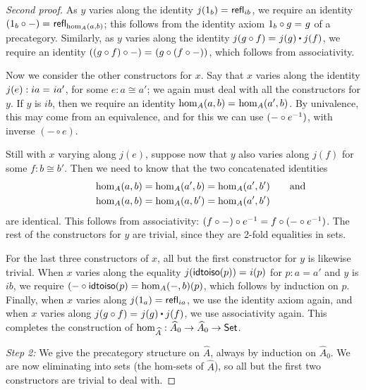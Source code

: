 \begin{proof}[Second proof]
  As $y$ varies along the identity $j(1_b) =_{} \mathsf{refl}_{ib}$, we require an identity $(1_b\circ -) =_{} \mathsf{refl}_{\hom_A(a,b)}$; this follows from the identity axiom $1_b\circ g =_{} g$ of a precategory.
  Similarly, as $y$ varies along the identity $\id{j(g\circ f)}{j(g)\ct j(f)}$, we require an identity $((g\circ f)\circ -) =_{} (g\circ (f\circ -))$, which follows from associativity.

  Now we consider the other constructors for $x$.
  Say that $x$ varies along the identity $j(e):ia =_{} ia'$, for some $e:a \cong a'$; we again must deal with all the constructors for $y$.
  If $y$ is $ib$, then we require an identity $\hom_A(a,b) =_{} \hom_A(a',b)$.
  By univalence, this may come from an equivalence, and for this we can use $(-\circ {e}^{-1})$, with inverse $(-\circ e)$.

  Still with $x$ varying along $j(e)$, suppose now that $y$ also varies along $j(f)$ for some $f:b\cong b'$.
  Then we need to know that the two concatenated identities
  \begin{gather*}
    \hom_A(a,b) = \hom_A(a',b) = \hom_A(a',b') \mathrlap{\qquad\text{and}}\\
    \hom_A(a,b) = \hom_A(a,b') = \hom_A(a',b')
  \end{gather*}
  are identical.
  This follows from associativity: $(f\circ -)\circ {e}^{-1} = f\circ (-\circ {e}^{-1})$.
  The rest of the constructors for $y$ are trivial, since they are 2-fold equalities in sets.

  For the last three constructors of $x$, all but the first constructor for $y$ is likewise trivial.
  When $x$ varies along the equality $j(\mathsf{idtoiso}(p)) =_{} {i}\mathopen{}\left({p}\right)\mathclose{}$ for $p:a=a'$ and $y$ is $ib$, we require $(-\circ \mathsf{idtoiso}(p) = {\hom_A(-,b)}\mathopen{}\left({p}\right)\mathclose{}$, which follows by induction on $p$.
  Finally, when $x$ varies along $j(1_a)=\mathsf{refl}_{ia}$, we use the identity axiom again, and when $x$ varies along $\id{j(g\circ f)}{j(g)\ct j(f)}$, we use associativity again.
  This completes the construction of $\hom_{\widehat A}:\widehat A_0 \to \widehat A_0 \to \mathsf{Set}$.

  \mentalpause

  \emph{Step 2:} We give the precategory structure on $\widehat A$, always by induction on $\widehat A_0$.
  We are now eliminating into sets (the hom-sets of $\widehat A$), so all but the first two constructors are trivial to deal with.


\end{proof}
